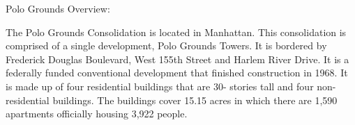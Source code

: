Polo Grounds Overview:     

   

The Polo Grounds Consolidation is located in Manhattan. This consolidation is comprised of a single development, Polo Grounds Towers. It is bordered by Frederick Douglas Boulevard, West 155th Street and Harlem River Drive. It is a federally funded conventional development that finished construction in 1968. It is made up of four residential buildings that are 30- stories tall and four non-residential buildings. The buildings cover 15.15 acres in which there are 1,590 apartments officially housing 3,922 people.